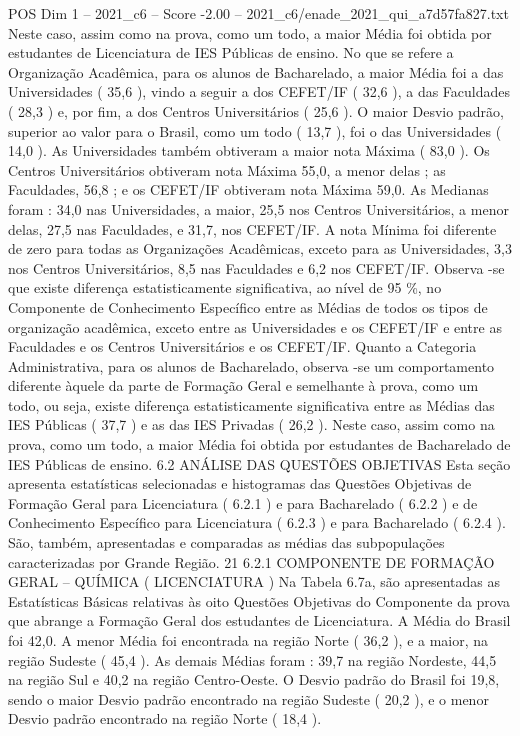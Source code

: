 \begin{textsample}{POS Dim 1 – 2021\_c6 – Score -2.00 – 2021\_c6/enade\_2021\_qui\_a7d57fa827.txt}
Neste caso, assim como na prova, como um todo, a maior Média foi obtida por estudantes de Licenciatura de IES Públicas de ensino.
No que se refere a Organização Acadêmica, para os alunos de Bacharelado, a maior Média foi a das Universidades ( 35,6 ), vindo a seguir a dos CEFET/IF ( 32,6 ), a das Faculdades ( 28,3 ) e, por fim, a dos Centros Universitários ( 25,6 ).
O maior Desvio padrão, superior ao valor para o Brasil, como um todo ( 13,7 ), foi o das Universidades ( 14,0 ).
As Universidades também obtiveram a maior nota Máxima ( 83,0 ).
Os Centros Universitários obtiveram nota Máxima 55,0, a menor delas ; as Faculdades, 56,8 ; e os CEFET/IF obtiveram nota Máxima 59,0.
As Medianas foram : 34,0 nas Universidades, a maior, 25,5 nos Centros Universitários, a menor delas, 27,5 nas Faculdades, e 31,7, nos CEFET/IF.
A nota Mínima foi diferente de zero para todas as Organizações Acadêmicas, exceto para as Universidades, 3,3 nos Centros Universitários, 8,5 nas Faculdades e 6,2 nos CEFET/IF.
Observa -se que existe diferença estatisticamente significativa, ao nível de 95 \%, no Componente de Conhecimento Específico entre as Médias de todos os tipos de organização acadêmica, exceto entre as Universidades e os CEFET/IF e entre as Faculdades e os Centros Universitários e os CEFET/IF.
Quanto a Categoria Administrativa, para os alunos de Bacharelado, observa -se um comportamento diferente àquele da parte de Formação Geral e semelhante à prova, como um todo, ou seja, existe diferença estatisticamente significativa entre as Médias das IES Públicas ( 37,7 ) e as das IES Privadas ( 26,2 ).
Neste caso, assim como na prova, como um todo, a maior Média foi obtida por estudantes de Bacharelado de IES Públicas de ensino. 6.2 ANÁLISE DAS QUESTÕES OBJETIVAS Esta seção apresenta estatísticas selecionadas e histogramas das Questões Objetivas de Formação Geral para Licenciatura ( 6.2.1 ) e para Bacharelado ( 6.2.2 ) e de Conhecimento Específico para Licenciatura ( 6.2.3 ) e para Bacharelado ( 6.2.4 ).
São, também, apresentadas e comparadas as médias das subpopulações caracterizadas por Grande Região. 21 6.2.1 COMPONENTE DE FORMAÇÃO GERAL – QUÍMICA ( LICENCIATURA ) Na Tabela 6.7a, são apresentadas as Estatísticas Básicas relativas às oito Questões Objetivas do Componente da prova que abrange a Formação Geral dos estudantes de Licenciatura.
A Média do Brasil foi 42,0.
A menor Média foi encontrada na região Norte ( 36,2 ), e a maior, na região Sudeste ( 45,4 ).
As demais Médias foram : 39,7 na região Nordeste, 44,5 na região Sul e 40,2 na região Centro-Oeste.
O Desvio padrão do Brasil foi 19,8, sendo o maior Desvio padrão encontrado na região Sudeste ( 20,2 ), e o menor Desvio padrão encontrado na região Norte ( 18,4 ).

\end{textsample}
